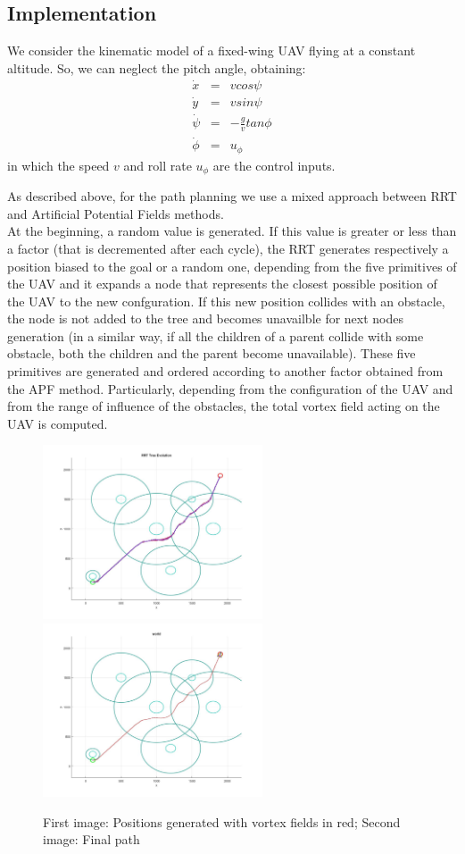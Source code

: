 \documentclass[oneside,onecolumn]{article}
\begin{document}
\subsection{Implementation}
We consider the kinematic model of a fixed-wing UAV flying at a constant altitude. So, we can neglect the pitch angle, obtaining:
\begin{equation}
\begin{array} {lcl} 
\dot{x} & = & vcos\psi \\
\dot{y} & = & vsin\psi \\ 
\dot{\psi} & = & -\frac{g}{v} tan \phi \\
\dot{\phi} & = & u_{\phi }
\end{array}
\label{linearsystem}
\end{equation}
in which the speed $v$ and roll rate $u_{\phi}$ are the control inputs.

As described above, for the path planning we use a mixed approach between RRT and Artificial Potential Fields methods.\\
At the beginning, a random value is generated. If this value is greater or less than a factor (that is decremented after each cycle), the RRT generates respectively a position biased to the goal or a random one, depending from the five primitives of the UAV and it expands a node that represents the closest possible position of the UAV to the new confguration. If this new position collides with an obstacle, the node is not added to the tree and becomes unavailble for next nodes generation (in a similar way, if all the children of a parent collide with some obstacle, both the children and the parent become unavailable).
These five primitives are generated and ordered according to another factor obtained from the 
APF method. Particularly, depending from the configuration of the UAV and from the range of influence of the obstacles, the total vortex field acting on the UAV is computed. 
\begin{figure}[htbp]
	\centering
	\includegraphics[width=6.5cm]{images/b}%
	\qquad\qquad
	\includegraphics[width=6.5cm]{images/a}\label{fig:3}
	\caption{First image: Positions generated with vortex fields in red; Second image: Final path}
\end{figure}
\end{document}
